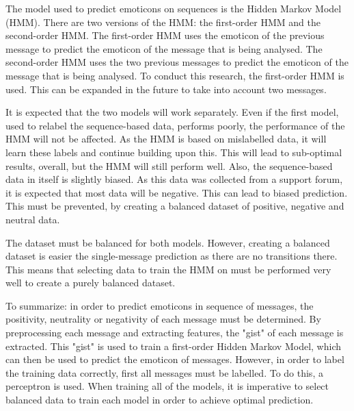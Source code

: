 The model used to predict emoticons on sequences is the Hidden Markov Model (HMM). There are two versions of the HMM: the first-order HMM and the second-order HMM. The first-order HMM uses the emoticon of the previous message to predict the emoticon of the message that is being analysed. The second-order HMM uses the two previous messages to predict the emoticon of the message that is being analysed. To conduct this research, the first-order HMM is used. This can be expanded in the future to take into account two messages.

It is expected that the two models will work separately. Even if the first model, used to relabel the sequence-based data, performs poorly, the performance of the HMM will not be affected. As the HMM is based on mislabelled data, it will learn these labels and continue building upon this. This will lead to sub-optimal results, overall, but the HMM will still perform well. Also, the sequence-based data in itself is slightly biased. As this data was collected from a support forum, it is expected that most data will be negative. This can lead to biased prediction. This must be prevented, by creating a balanced dataset of positive, negative and neutral data. 

The dataset must be balanced for both models. However, creating a balanced dataset is easier the single-message prediction as there are no transitions there. This means that selecting data to train the HMM on must be performed very well to create a purely balanced dataset.

To summarize: in order to predict emoticons in sequence of messages, the positivity, neutrality or negativity of each message must be determined. By preprocessing each message and extracting features, the "gist" of each message is extracted. This "gist" is used to train a first-order Hidden Markov Model, which can then be used to predict the emoticon of messages. However, in order to label the training data correctly, first all messages must be labelled. To do this, a perceptron is used. When training all of the models, it is imperative to select balanced data to train each model in order to achieve optimal prediction.
